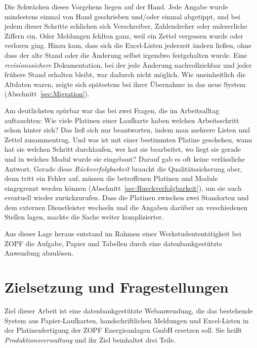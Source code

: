 Die Schwächen dieses Vorgehens liegen auf der Hand. Jede Angabe wurde
mindestens einmal von Hand geschrieben und/oder einmal abgetippt, und bei jedem
dieser Schritte schlichen sich Verschreiber, Zahlendreher oder unleserliche
Ziffern ein. Oder Meldungen fehlten ganz, weil ein Zettel vergessen wurde
oder verloren ging. Hinzu kam, dass sich die Excel-Listen jederzeit ändern
ließen, ohne dass der alte Stand oder die Änderung selbst irgendwo festgehalten
wurde. Eine \emph{revisionssichere} Dokumentation, bei der jede Änderung
nachvollziehbar und jeder frühere Stand erhalten bleibt, war dadurch nicht möglich.
Wie uneinheitlich die Altdaten waren, zeigte sich spätestens bei
ihrer Übernahme in das neue System (Abschnitt~\ref{sec:Migration}).

Am deutlichsten spürbar war das bei zwei Fragen, die im Arbeitsalltag
auftauchten: Wie viele Platinen einer Laufkarte haben welchen Arbeitsschritt
schon hinter sich? Das ließ sich nur beantworten, indem man mehrere Listen und
Zettel zusammentrug. Und was ist mit einer bestimmten Platine geschehen, wann
hat sie welchen Schritt durchlaufen, wer hat sie bearbeitet, wo liegt sie
gerade und in welches Modul wurde sie eingebaut? Darauf gab es oft keine
verlässliche Antwort. Gerade diese \emph{Rückverfolgbarkeit} braucht die
Qualitätssicherung aber, denn tritt ein Fehler auf, müssen die betroffenen Platinen
und Module eingegrenzt werden können (Abschnitt~\ref{sec:Rueckverfolgbarkeit}), um sie auch eventuell wieder zurückzurufen.
Dass die Platinen zwischen zwei Standorten und dem externen Dienstleister
wechseln und die Angaben darüber an verschiedenen Stellen lagen, machte die
Sache weiter komplizierter.

Aus dieser Lage heraus entstand im Rahmen einer Werkstudententätigkeit bei
ZOPF die Aufgabe, Papier und Tabellen durch eine datenbankgestützte Anwendung
abzulösen.

\section{Zielsetzung und Fragestellungen}
\label{sec:Zielsetzung}
Ziel dieser Arbeit ist eine datenbankgestützte Webanwendung, die das bestehende System aus
Papier-Laufkarten, handschriftlichen Meldungen und Excel-Listen in der
Platinenfertigung der ZOPF Energieanlagen GmbH ersetzen soll. Sie heißt \emph{Produktionsverwaltung} und ihr Ziel beinhaltet drei Teile.


